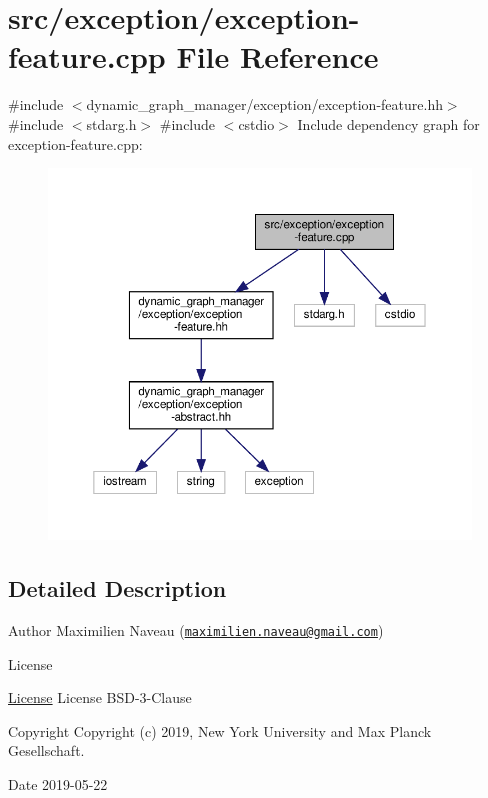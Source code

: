 \hypertarget{exception-feature_8cpp}{}\section{src/exception/exception-\/feature.cpp File Reference}
\label{exception-feature_8cpp}
{\ttfamily \#include $<$dynamic\+\_\+graph\+\_\+manager/exception/exception-\/feature.\+hh$>$}\newline
{\ttfamily \#include $<$stdarg.\+h$>$}\newline
{\ttfamily \#include $<$cstdio$>$}\newline
Include dependency graph for exception-\/feature.cpp\+:
\nopagebreak
\begin{figure}[H]
\begin{center}
\leavevmode
\includegraphics[width=350pt]{exception-feature_8cpp__incl}
\end{center}
\end{figure}


\subsection{Detailed Description}
\begin{DoxyAuthor}{Author}
Maximilien Naveau (\href{mailto:maximilien.naveau@gmail.com}{\tt maximilien.\+naveau@gmail.\+com}) 
\end{DoxyAuthor}
\begin{DoxyRefDesc}{License}
\item[\hyperlink{license__license000047}{License}]License B\+S\+D-\/3-\/\+Clause \end{DoxyRefDesc}
\begin{DoxyCopyright}{Copyright}
Copyright (c) 2019, New York University and Max Planck Gesellschaft. 
\end{DoxyCopyright}
\begin{DoxyDate}{Date}
2019-\/05-\/22 
\end{DoxyDate}
